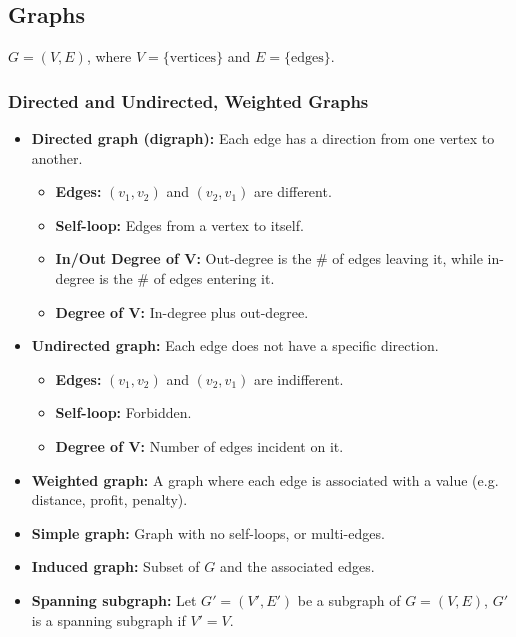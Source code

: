 \subsection{Graphs}
    \begin{definition}
        $G = (V, E)$, where $V = \{\text{vertices}\}$ and $E = \{\text{edges}\}$.
    \end{definition}

    \subsubsection{Directed and Undirected, Weighted Graphs}
        \begin{terminology}
            \begin{itemize}
                \item \textbf{Directed graph (digraph):} Each edge has a direction from one vertex to another. 
                \begin{itemize}
                    \item \textbf{Edges:} $(v_1,v_2)$ and $(v_2,v_1)$ are different.
                    \item \textbf{Self-loop:} Edges from a vertex to itself.
                    \item \textbf{In/Out Degree of V:} Out-degree is the \# of edges leaving it, while in-degree is the \# of edges entering it.
                    \item \textbf{Degree of V:} In-degree plus out-degree.
                \end{itemize}
                \item \textbf{Undirected graph:} Each edge does not have a specific direction.
                \begin{itemize}
                    \item \textbf{Edges:} $(v_1,v_2)$ and $(v_2,v_1)$ are indifferent.
                    \item \textbf{Self-loop:} Forbidden.
                    \item \textbf{Degree of V:} Number of edges incident on it.
                \end{itemize}
                \item \textbf{Weighted graph:} A graph where each edge is associated with a value (e.g. distance, profit, penalty).
                \item \textbf{Simple graph:} Graph with no self-loops, or multi-edges.
                \item \textbf{Induced graph:} Subset of $G$ and the associated edges.
                \item \textbf{Spanning subgraph:} Let $G' = (V',E')$ be a subgraph of $G=(V,E)$, $G'$ is a spanning subgraph if $V'=V$.
            \end{itemize}
        \end{terminology}

